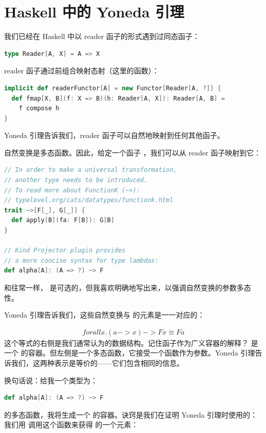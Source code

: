 \section{Haskell 中的 Yoneda 引理}

我们已经在 Haskell 中以 reader 函子的形式遇到过同态函子：

\begin{lstlisting}[language=Scala]
type Reader[A, X] = A => X
\end{lstlisting}
reader 函子通过前组合映射态射（这里的函数）：

\begin{lstlisting}[language=Scala]
implicit def readerFunctor[A] = new Functor[Reader[A, ?]] {
  def fmap[X, B](f: X => B)(h: Reader[A, X]): Reader[A, B] =
    f compose h
}
\end{lstlisting}
Yoneda 引理告诉我们，reader 函子可以自然地映射到任何其他函子。

自然变换是多态函数。因此，给定一个函子 ，我们可以从 reader 函子映射到它：

\begin{lstlisting}[language=Scala]
// In order to make a universal transformation,
// another type needs to be introduced.
// To read more about FunctionK (~>):
// typelevel.org/cats/datatypes/functionk.html
trait ~>[F[_], G[_]] {
  def apply[B](fa: F[B]): G[B]
}

// Kind Projector plugin provides
// a more concise syntax for type lambdas:
def alpha[A]: (A => ?) ~> F
\end{lstlisting}
和往常一样， 是可选的，但我喜欢明确地写出来，以强调自然变换的参数多态性。

Yoneda 引理告诉我们，这些自然变换与  的元素是一一对应的：

\begin{align}
  forall x . (a -> x) -> F x \ensuremath{\cong} F a
\end{align}
这个等式的右侧是我们通常认为的数据结构。记住函子作为广义容器的解释？ 是一个  的容器。但左侧是一个多态函数，它接受一个函数作为参数。Yoneda 引理告诉我们，这两种表示是等价的——它们包含相同的信息。

换句话说：给我一个类型为：

\begin{lstlisting}[language=Scala]
def alpha[A]: (A => ?) ~> F
\end{lstlisting}
的多态函数，我将生成一个  的容器。诀窍是我们在证明 Yoneda 引理时使用的：我们用  调用这个函数来获得  的一个元素：

